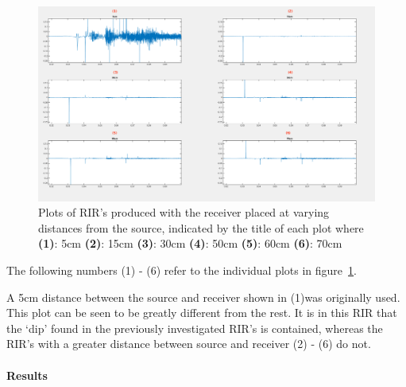 \documentclass[../../main.tex]{subfiles}
\begin{document}
			\begin{figure}[H]
				\centerline{\includegraphics[scale = 0.3]{Sections/Implementation/Odeon/images/incorrectRIR/HeightTest_Edit.png}}
				\caption{Plots of \ac{RIR}'s produced with the receiver placed at varying distances from the source, indicated by the title of each plot where \textbf{(1)}: 5cm \textbf{(2)}: 15cm \textbf{(3)}: 30cm \textbf{(4)}: 50cm \textbf{(5)}: 60cm \textbf{(6)}: 70cm}
				\label{HeightTest}
			\end{figure}

			The following numbers (1) - (6) refer to the individual plots in figure~\ref{HeightTest}.

			A 5cm distance between the source and receiver shown in (1)\footnotemark[1] was originally used. This plot can be seen to be greatly different from the rest. It is in this \ac{RIR} that the `dip' found in the previously investigated \ac{RIR}'s is contained, whereas the \ac{RIR}'s with a greater distance between source and receiver (2) - (6) do not.


			\paragraph{Results}
\end{document}
